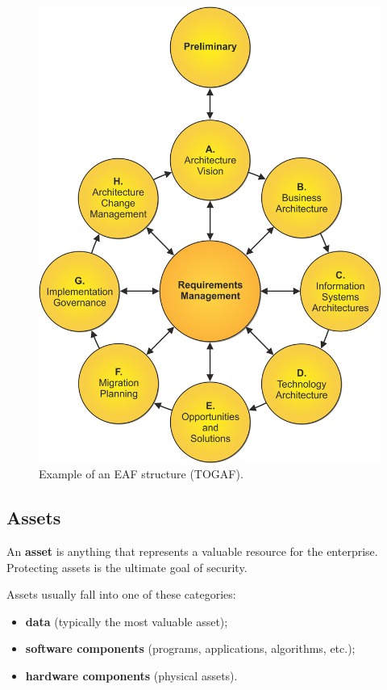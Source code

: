 \begin{figure}[H]
\centering
\includegraphics[scale=0.6]{img/togaf.png}
\decoRule
\caption{Example of an EAF structure (TOGAF).}
\label{fig:togaf}
\end{figure}


\subsection{Assets}
An \textbf{asset} is anything that represents a valuable resource for the enterprise. Protecting assets is the ultimate goal of security.

Assets usually fall into one of these categories:

\begin{itemize}
    \item \textbf{data} (typically the most valuable asset);
    \item \textbf{software components} (programs, applications, algorithms, etc.);
    \item \textbf{hardware components} (physical assets).
\end{itemize}


